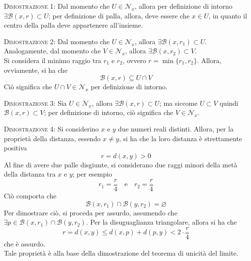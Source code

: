 \documentclass[a4paper]{extarticle}
\begin{document}
\vspace{2em}
\noindent
\normalfont \normalsize
\textsc{Dimostrazione 1}: Dal momento che $U \in \mathcal{N}_x$, allora per definizione di intorno $\exists \mathcal{B}(x,r) \subset U$; per definizione di palla, allora, deve essere che $x \in U$, in quanto il centro della palla deve appartenere all'insieme.

\vspace{2em}
\noindent
\normalfont \normalsize
\textsc{Dimostrazione 2}: Dal momento che $U \in \mathcal{N}_x$, allora $\exists \mathcal{B}(x,r_1) \subset U$. Analogamente, dal momento che $V \in \mathcal{N}_x$, allora $\exists \mathcal{B}(x,r_2) \subset V$.\\
Si considera il minimo raggio tra $r_1$ e $r_2$, ovvero $r=\min\{r_1,r_2\}$. Allora, ovviamente, si ha che
\[\mathcal{B}(x,r) \subseteq U \cap V\]
Ciò significa che $U \cap V \in \mathcal{N}_x$ per definizione di intorno.

\vspace{2em}
\noindent
\normalfont \normalsize
\textsc{Dimostrazione 3}: Sia $U \in \mathcal{N}_x$, allora $\exists \mathcal{B}(x,r) \subset U$; ma siccome $U \subset V$ quindi $\mathcal{B}(x,r) \subset V$; per definizione di intorno, ciò significa che $V \in \mathcal{N}_x$.

\vspace{2em}
\noindent
\normalfont \normalsize
\textsc{Dimostrazione 4}: Si considerino $x$ e $y$ due numeri reali distinti. Allora, per la proprietà della distanza, essendo $x \neq y$, si ha che la loro distanza è strettamente positiva
\[r = d(x,y) > 0\]
Al fine di avere due palle disgiunte, si considerano due raggi minori della metà della distanza tra $x$ e $y$; per esempio
\[r_1=\frac{r}{4} \hspace{1em} \text{e} \hspace{1em} r_2=\frac{r}{4}\]
Ciò comporta che
\[\mathcal{B}(x,r_1) \cap \mathcal{B}(y,r_2) = \varnothing\]
Per dimostrare ciò, si proceda per assurdo, assumendo che $\exists p \in \mathcal{B}(x,r_1) \cap \mathcal{B}(y,r_2)$. Per la disuguaglianza triangolare, allora si ha che
\[r=d(x,y) \leq d(x,p) + d(p,y) < 2 \cdot \frac{r}{4}\]
che è assurdo.\\
Tale proprietà è alla base della dimostrazione del teorema di unicità del limite.

\vspace{1em}
\noindent
\end{document}

